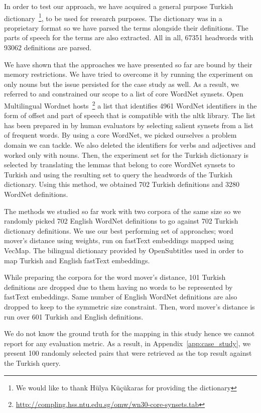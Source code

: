 In order to test our approach, we have acquired a general purpose Turkish dictionary~\footnote{We would like to thank Hülya Küçükaras for providing the dictionary}, to be used for research purposes.
The dictionary was in a proprietary format so we have parsed the terms alongside their definitions.
The parts of speech for the terms are also extracted.
All in all, 67351 headwords with 93062 definitions are parsed.

We have shown that the approaches we have presented so far are bound by their memory restrictions.
We have tried to overcome it by running the experiment on only nouns but the issue persisted for the case study as well.
As a result, we referred to \textcite{khodak_automated_2017} and constrained our scope to a list of core WordNet synsets.
Open Multilingual Wordnet hosts~\footnote{\url{http://compling.hss.ntu.edu.sg/omw/wn30-core-synsets.tab}} a list that identifies 4961 WordNet identifiers in the form of offset and part of speech that is compatible with the nltk library.
The list has been prepared in \textcite{boyd-graber_adding_2006} by human evaluators by selecting salient synsets from a list of frequent words.
By using a core WordNet, we picked ourselves a problem domain we can tackle.
We also deleted the identifiers for verbs and adjectives and worked only with nouns.
Then, the experiment set for the Turkish dictionary is selected by translating the lemmas that belong to core WordNet synsets to Turkish and using the resulting set to query the headwords of the Turkish dictionary.
Using this method, we obtained 702 Turkish definitions and 3280 WordNet definitions.

The methods we studied so far work with two corpora of the same size so we randomly picked 702 English WordNet definitions to go against 702 Turkish dictionary definitions.
We use our best performing set of approaches; word mover's distance using \tfidf{} weights, run on fastText embeddings mapped using VecMap.
The bilingual dictionary provided by OpenSubtitles used in order to map Turkish and English fastText embeddings.

While preparing the corpora for the word mover's distance, 101 Turkish definitions are dropped due to them having no words to be represented by fastText embeddings.
Same number of English WordNet definitions are also dropped to keep to the symmetric size constraint.
Then, word mover's distance is run over 601 Turkish and English definitions.

We do not know the ground truth for the mapping in this study hence we cannot report for any evaluation metric.
As a result, in Appendix~\ref{app:case_study}, we present 100 randomly selected pairs that were retrieved as the top result against the Turkish query.
